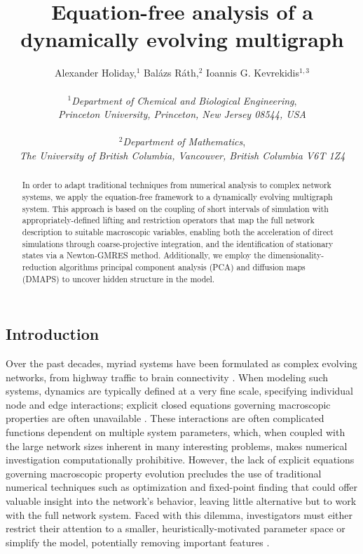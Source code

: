 \documentclass[12pt]{article}
\title{\vspace{-5mm}Equation-free analysis of a dynamically evolving multigraph}
\author{Alexander Holiday,$^1$ Bal\'{a}zs R\'{a}th,$^2$ Ioannis G. Kevrekidis$^{1,3}$ \\ \\
  $^1$\textit{Department of Chemical and Biological Engineering}, \\
  \textit{Princeton University, Princeton, New Jersey 08544, USA} \\ \\
  $^2$\textit{Department of Mathematics}, \\
  \textit{The University of British Columbia, Vancouver, British Columbia V6T 1Z4}
}
\date{}
\begin{document}
\maketitle
\begin{onehalfspace}

\begin{abstract}
In order to adapt traditional techniques from numerical analysis to complex network systems, we apply the equation-free framework to a dynamically evolving multigraph system. This approach is based on the coupling of short intervals of simulation with appropriately-defined lifting and restriction operators that map the full network description to suitable macroscopic variables, enabling both the acceleration of direct simulations through coarse-projective integration, and the identification of stationary states via a Newton-GMRES method. Additionally, we employ the dimensionality-reduction algorithms principal component analysis (PCA) and diffusion maps (DMAPS) to uncover hidden structure in the model.
\end{abstract}

\pagebreak

\section{Introduction}
\label{sec:intro}


Over the past decades, myriad systems have been formulated as complex evolving networks, from highway traffic \cite{joubert_large-scale_2010} to brain connectivity \cite{hermundstad_learning_2011}. When modeling such systems, dynamics are typically defined at a very fine scale, specifying individual node and edge interactions; explicit closed equations governing macroscopic properties are often unavailable \cite{durrett_graph_2012, joubert_large-scale_2010, roche_agent-based_2011, swaminathan_modeling_1998}. These interactions are often complicated functions dependent on multiple system parameters, which, when coupled with the large network sizes inherent in many interesting problems, makes numerical investigation computationally prohibitive. However, the lack of explicit equations governing macroscopic property evolution precludes the use of traditional numerical techniques such as optimization and fixed-point finding that could offer valuable insight into the network's behavior, leaving little alternative but to work with the full network system. Faced with this dilemma, investigators must either restrict their attention to a smaller, heuristically-motivated parameter space \cite{hodgkin_quantitative_1952} or simplify the model, potentially removing important features \cite{brown_variability_1999}. \par


\end{onehalfspace}
\end{document}
